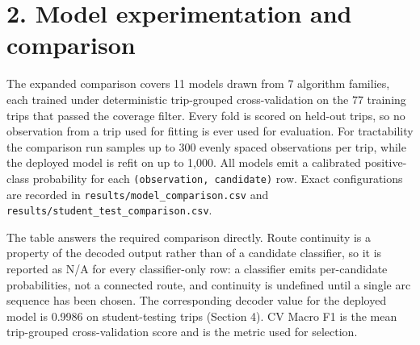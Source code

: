\documentclass[11pt,a4paper]{article}
\newcommand{\code}[1]{\texttt{\small #1}}
\begin{document}
\section{2. Model experimentation and comparison}

The expanded comparison covers 11 models drawn from 7 algorithm families, each trained under deterministic trip-grouped cross-validation on the 77 training trips that passed the coverage filter. Every fold is scored on held-out trips, so no observation from a trip used for fitting is ever used for evaluation. For tractability the comparison run samples up to 300 evenly spaced observations per trip, while the deployed model is refit on up to 1,000. All models emit a calibrated positive-class probability for each \code{(observation,\allowbreak{} candidate)} row. Exact configurations are recorded in \code{results/\allowbreak{}model\_\allowbreak{}comparison.\allowbreak{}csv} and \code{results/\allowbreak{}student\_\allowbreak{}test\_\allowbreak{}comparison.\allowbreak{}csv}.

The table answers the required comparison directly. Route continuity is a property of the decoded output rather than of a candidate classifier, so it is reported as N/A for every classifier-only row: a classifier emits per-candidate probabilities, not a connected route, and continuity is undefined until a single arc sequence has been chosen. The corresponding decoder value for the deployed model is 0.9986 on student-testing trips (Section 4). CV Macro F1 is the mean trip-grouped cross-validation score and is the metric used for selection.
\end{document}
